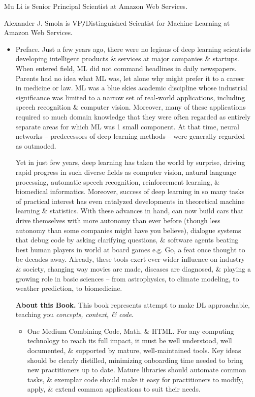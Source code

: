 \documentclass{article}
\begin{document}
{\sc Mu Li} is Senior Principal Scientist at Amazon Web Services.

{\sc Alexander J. Smola} is VP{\tt/}Distinguished Scientist for Machine Learning at Amazon Web Services.
\begin{itemize}
	\item {\sf Preface.} Just a few years ago, there were no legions of deep learning scientists developing intelligent products \& services at major companies \& startups. When entered field, ML did not command headlines in daily newspapers. Parents had no idea what ML was, let alone why might prefer it to a career in medicine or law. ML was a blue skies academic discipline whose industrial significance was limited to a narrow set of real-world applications, including speech recognition \& computer vision. Moreover, many of these applications required so much domain knowledge that they were often regarded as entirely separate areas for which ML was 1 small component. At that time, neural networks -- predecessors of deep learning methods -- were generally regarded as outmoded.

	Yet in just few years, deep learning has taken the world by surprise, driving rapid progress in such diverse fields as computer vision, natural language processing, automatic speech recognition, reinforcement learning, \& biomedical informatics. Moreover, success of deep learning in so many tasks of practical interest has even catalyzed developments in theoretical machine learning \& statistics. With these advances in hand, can now build cars that drive themselves with more autonomy than ever before (though less autonomy than some companies might have you believe), dialogue systems that debug code by asking clarifying questions, \& software agents beating best human players in world at board games e.g. Go, a feat once thought to be decades away. Already, these tools exert ever-wider influence on industry \& society, changing way movies are made, diseases are diagnosed, \& playing a growing role in basic sciences -- from astrophysics, to climate modeling, to weather prediction, to biomedicine.

	{\bf About this Book.} This book represents attempt to make DL approachable, teaching you {\it concepts, context, \& code}.
	\begin{itemize}
		\item {\sf One Medium Combining Code, Math, \& HTML.} For any computing technology to reach its full impact, it must be well understood, well documented, \& supported by mature, well-maintained tools. Key ideas should be clearly distilled, minimizing onboarding time needed to bring new practitioners up to date. Mature libraries should automate common tasks, \& exemplar code should make it easy for practitioners to modify, apply, \& extend common applications to suit their needs.


\end{itemize}
\end{itemize}
\end{document}
